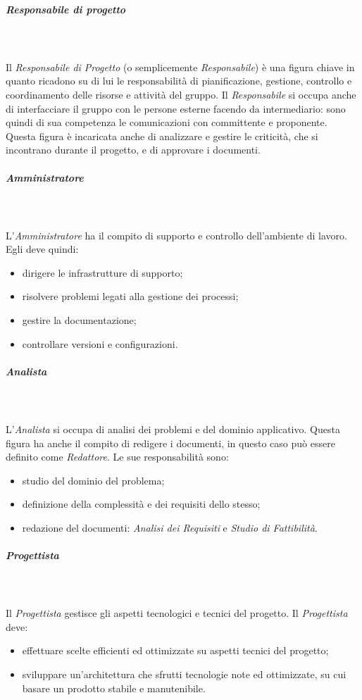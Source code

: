 \subparagraph*{Responsabile di progetto}\mbox{} \\ \mbox{} \\
Il \textit{Responsabile di Progetto} (o semplicemente \textit{Responsabile}) è una figura chiave in quanto ricadono su di lui le responsabilità di pianificazione, gestione, controllo e coordinamento delle risorse e attività del gruppo. Il \textit{Responsabile} si occupa anche di interfacciare il gruppo con le persone esterne facendo da intermediario: sono quindi di sua competenza le comunicazioni con committente e proponente.
Questa figura è incaricata anche di analizzare e gestire le criticità, che si incontrano durante il progetto, e di approvare i documenti.

\subparagraph*{Amministratore}\mbox{} \\ \mbox{} \\
L'\textit{Amministratore} ha il compito di supporto e controllo dell'ambiente di lavoro.
Egli deve quindi:
\begin{itemize}
	\item dirigere le infrastrutture di supporto;
	\item risolvere problemi legati alla gestione dei processi;
	\item gestire la documentazione;
	\item controllare versioni e configurazioni.
\end{itemize}

\subparagraph*{Analista}\mbox{} \\ \mbox{} \\
L'\textit{Analista} si occupa di analisi dei problemi e del dominio applicativo. Questa figura ha anche il compito di redigere i documenti, in questo caso può essere definito come \textit{Redattore}.
Le sue responsabilità sono:
\begin{itemize}
	\item studio del dominio del problema;
	\item definizione della complessità e dei requisiti dello stesso;
	\item redazione del documenti:\textit{ Analisi dei Requisiti} e \textit{Studio di Fattibilità}.
\end{itemize}

\subparagraph*{Progettista}\mbox{} \\ \mbox{} \\
Il \textit{Progettista} gestisce gli aspetti tecnologici e tecnici del progetto.
Il \textit{Progettista} deve:
\begin{itemize}
	\item effettuare scelte efficienti ed ottimizzate su aspetti tecnici del progetto;
	\item sviluppare un'architettura che sfrutti tecnologie note ed ottimizzate, su cui basare un prodotto stabile e manutenibile.
\end{itemize}

